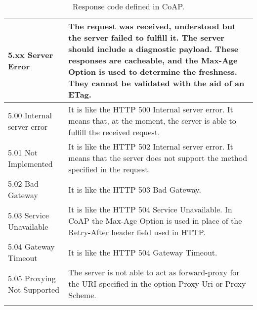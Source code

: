 \begin{longtable}{|l|X|}
\textbf{5.xx Server Error} & The request was received, understood but the server failed to fulfill it.
The server should include a diagnostic payload.
These responses are cacheable, and the Max-Age Option is used to determine the freshness.
They cannot be validated with the aid of an ETag.\\\hline

5.00 Internal server error &	It is like the HTTP 500 Internal server error.
It means that, at the moment, the server is able to fulfill the received request.\\\hline

5.01 Not Implemented & It is like the HTTP 502 Internal server error.
It means that the server does not support the method specified in the request.\\\hline

5.02 Bad Gateway & It is like the HTTP 503 Bad Gateway.\\\hline

5.03 Service Unavailable & It is like the HTTP 504 Service Unavailable.
In CoAP the Max-Age Option is used in place of the Retry-After header field used in HTTP.\\\hline

5.04 Gateway Timeout & It is like the HTTP 504 Gateway Timeout.\\\hline

5.05 Proxying Not Supported	& The server is not able to act as forward-proxy for the URI specified in the option Proxy-Uri or Proxy-Scheme.\\\hline


\caption{Response code defined in CoAP.}
\label{tab:table6}
\end{longtable}